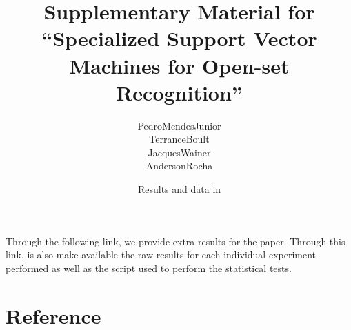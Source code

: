 



\renewcommand\highlightauthorname[1]{#1}

\title{Supplementary Material for ``Specialized Support Vector Machines for Open-set Recognition''}
\author{\gls{PedroMendesJunior}\\%
  \gls{TerranceBoult}\\%
  \gls{JacquesWainer}\\%
  \gls{AndersonRocha}\\%
}
\date{Results and data in }



\maketitle

Through the following link, we provide extra results for the paper.
Through this link, is also make available the raw results for each individual experiment performed as well as the script used to perform the statistical tests.

\begin{center}
\end{center}

\section*{Reference}

\begin{publications}
  \\

\end{publications}




